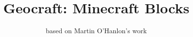 \documentclass[twocolumn]{geocraft-worksheet}
\begin{document}
\title{Geocraft: Minecraft Blocks}
\subtitle{based on Martin O'Hanlon's work}
\date{}

\twocolumn[
 \begin{@twocolumnfalse}
   \maketitle
 \end{@twocolumnfalse}
]

\begin{center}



    \tabletail{\hline}

    \tablelasttail{\hline}



\end{center}
\end{document}
